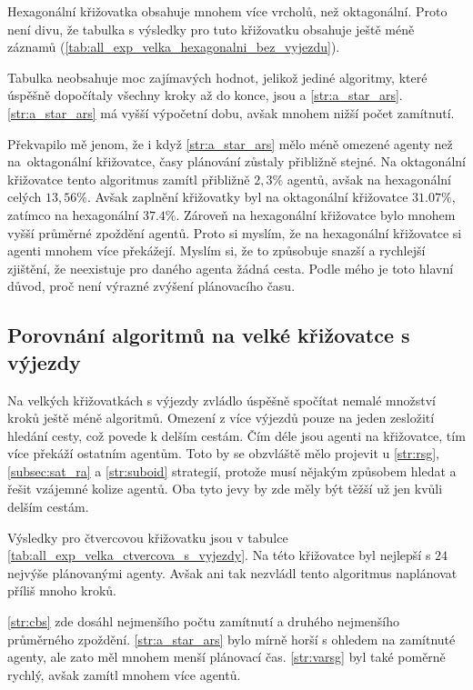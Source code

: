 Hexagonální křižovatka obsahuje mnohem více vrcholů, než oktagonální.
Proto není divu,
že tabulka s výsledky pro tuto křižovatku obsahuje ještě méně záznamů (\ref{tab:all_exp_velka_hexagonalni_bez_vyjezdu}).

Tabulka neobsahuje moc zajímavých hodnot, jelikož jediné algoritmy, které úspěšně dopočítaly všechny kroky až do konce,
jsou  a \ref{str:a_star_ars}.
\ref{str:a_star_ars} má vyšší výpočetní dobu, avšak mnohem nižší počet zamítnutí.

Překvapilo mě jenom, že i když \ref{str:a_star_ars} mělo méně omezené agenty než na~oktagonální křižovatce,
časy plánování zůstaly přibližně stejné.
Na oktagonální křižovatce tento algoritmus zamítl přibližně $2,3\%$ agentů, avšak na hexagonální celých $13,56\%$.
Avšak zaplnění křižovatky byl na oktagonální křižovatce $31.07\%$, zatímco na hexagonální $37.4\%$.
Zároveň na hexagonální křižovatce bylo mnohem vyšší průměrné zpoždění agentů.
Proto si myslím, že na hexagonální křižovatce si agenti mnohem více překážejí.
Myslím si, že to způsobuje snazší a rychlejší zjištění, že neexistuje pro daného agenta žádná cesta.
Podle mého je toto hlavní důvod, proč není výrazné zvýšení plánovacího času.



\subsection{Porovnání algoritmů na velké křižovatce s výjezdy}
\label{subsec:porovnani_algoritmu_na_velke_krizovatce_s_vyjezdy}

Na velkých křižovatkách s výjezdy zvládlo úspěšně spočítat nemalé množství kroků ještě méně algoritmů.
Omezení z více výjezdů pouze na jeden zesložití hledání cesty, což povede k delším cestám.
Čím déle jsou agenti na křižovatce, tím více překáží ostatním agentům.
Toto by se obzvláště mělo projevit u \ref{str:rsg}, \ref{subsec:sat_ra} a \ref{str:suboid} strategií,
protože musí nějakým způsobem hledat a řešit vzájemné kolize agentů.
Oba tyto jevy by zde měly být těžší už jen kvůli delším cestám.

Výsledky pro čtvercovou křižovatku jsou v tabulce \ref{tab:all_exp_velka_ctvercova_s_vyjezdy}.
Na této křižovatce byl  nejlepší s $24$ nejvýše plánovanými agenty.
Avšak ani tak nezvládl tento algoritmus naplánovat příliš mnoho kroků.

\ref{str:cbs} zde dosáhl nejmenšího počtu zamítnutí a druhého nejmenšího průměrného zpoždění.
\ref{str:a_star_ars} bylo mírně horší s ohledem na zamítnuté agenty, ale zato měl mnohem menší plánovací čas.
\ref{str:varsg} byl také poměrně rychlý, avšak zamítl mnohem více agentů.

